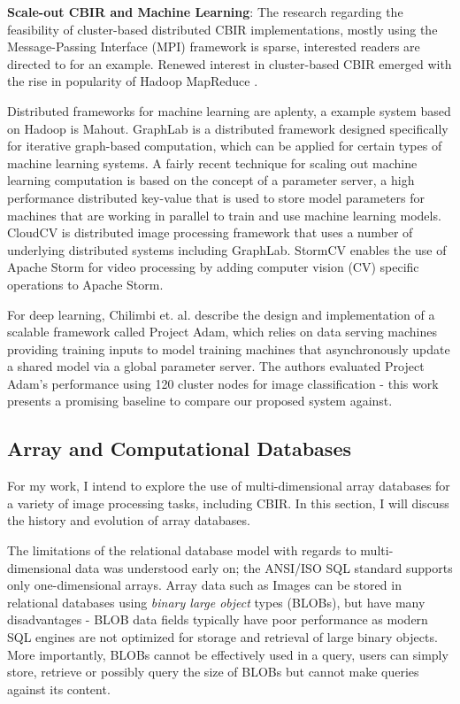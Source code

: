 \documentclass[letterpaper,twocolumn,10pt]{article}
\begin{document}
\textbf {Scale-out CBIR and Machine Learning}: The research regarding the feasibility of cluster-based distributed CBIR implementations, mostly using the Message-Passing Interface (MPI) framework is sparse, interested readers are directed to \cite{1508203} for an example. Renewed interest in cluster-based CBIR emerged with the rise in popularity of Hadoop MapReduce \cite{premchaiswadi2013improving, gu2012content, 6632112}. 

Distributed frameworks for machine learning are aplenty, a example system based on Hadoop is Mahout\cite{owen2011mahout}. GraphLab\cite{low2012distributed} is a distributed framework designed specifically for iterative graph-based computation, which can be applied for certain types of machine learning systems. A fairly recent technique for scaling out machine learning computation is based on the concept of a parameter server\cite{Li:2014:SDM:2685048.2685095}, a high performance distributed key-value that is used to store model parameters for machines that are working in parallel to train and use machine learning models. CloudCV\cite{DBLP:journals/corr/AgrawalMGCBMOB15} is distributed image processing framework that uses a number of underlying distributed systems including GraphLab. StormCV\cite{stormCV} enables the use of Apache Storm for video processing by adding computer vision (CV) specific operations to Apache Storm\cite{storm}.

For deep learning, Chilimbi et. al.\cite{chilimbi2014project} describe the design and implementation of a scalable framework called Project Adam, which relies on data serving machines providing training inputs to model training machines that asynchronously update a shared model via a global parameter server. The authors evaluated Project Adam's performance using 120 cluster nodes for image classification - this work presents a promising baseline to compare our proposed system against.  


\subsection{Array and Computational Databases}
For my work, I intend to explore the use of multi-dimensional array databases for a variety of image processing tasks, including CBIR. In this section, I will discuss the history and evolution of array databases.

The limitations of the relational database model with regards to multi-dimensional data was understood early on\cite{baumann}; the ANSI/ISO SQL standard\cite{ISO:SQL} supports only one-dimensional arrays. Array data such as Images can be stored in relational databases using {\em binary large object} types (BLOBs), but have many disadvantages - BLOB data fields typically have poor performance as modern SQL engines are not optimized for storage and retrieval of large binary objects. More importantly, BLOBs cannot be effectively used in a query, users can simply store, retrieve or possibly query the size of BLOBs but cannot make queries against its content. 
\end{document}
